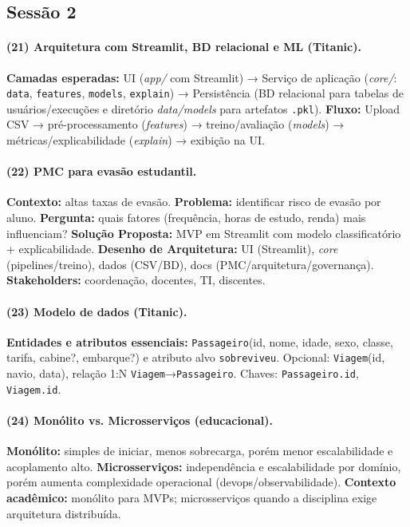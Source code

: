 \documentclass[12pt,a4paper]{article}
\begin{document}
\subsection*{Sessão 2}

\paragraph{(21) Arquitetura com Streamlit, BD relacional e ML (Titanic).}
\textbf{Camadas esperadas:}
UI (\textit{app/} com Streamlit) → Serviço de aplicação (\textit{core/}: \texttt{data}, \texttt{features}, \texttt{models}, \texttt{explain}) → Persistência (BD relacional para tabelas de usuários/execuções e diretório \textit{data/models} para artefatos \texttt{.pkl}). 
\textbf{Fluxo:} Upload CSV → pré-processamento (\textit{features}) → treino/avaliação (\textit{models}) → métricas/explicabilidade (\textit{explain}) → exibição na UI.

\paragraph{(22) PMC para evasão estudantil.}
\textbf{Contexto:} altas taxas de evasão. 
\textbf{Problema:} identificar risco de evasão por aluno. 
\textbf{Pergunta:} quais fatores (frequência, horas de estudo, renda) mais influenciam? 
\textbf{Solução Proposta:} MVP em Streamlit com modelo classificatório + explicabilidade. 
\textbf{Desenho de Arquitetura:} UI (Streamlit), \textit{core} (pipelines/treino), dados (CSV/BD), docs (PMC/arquitetura/governança). 
\textbf{Stakeholders:} coordenação, docentes, TI, discentes.

\paragraph{(23) Modelo de dados (Titanic).}
\textbf{Entidades e atributos essenciais:}
\texttt{Passageiro}(id, nome, idade, sexo, classe, tarifa, cabine?, embarque?) e atributo alvo \texttt{sobreviveu}. 
Opcional: \texttt{Viagem}(id, navio, data), relação 1:N \texttt{Viagem}→\texttt{Passageiro}. Chaves: \texttt{Passageiro.id}, \texttt{Viagem.id}.

\paragraph{(24) Monólito vs. Microsserviços (educacional).}
\textbf{Monólito:} simples de iniciar, menos sobrecarga, porém menor escalabilidade e acoplamento alto. 
\textbf{Microsserviços:} independência e escalabilidade por domínio, porém aumenta complexidade operacional (devops/observabilidade). 
\textbf{Contexto acadêmico:} monólito para MVPs; microsserviços quando a disciplina exige arquitetura distribuída.
\end{document}
